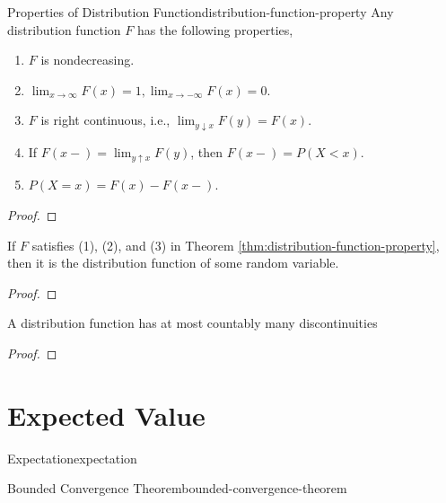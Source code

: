 \begin{theorem}{Properties of Distribution Function}{distribution-function-property}
    Any distribution function $F$ has the following properties,
    \begin{enumerate}
        \item $F$ is nondecreasing.
        \item $\lim_{x\rightarrow\infty}F(x)=1,\lim_{x \rightarrow-\infty}F(x)=0$.
        \item $F$ is right continuous, i.e., $\lim_{y \downarrow x} F(y)=F(x)$.
        \item If $F(x-)=\lim_{y\uparrow x}F(y)$, then $F(x-)=P(X<x)$.
        \item $P(X=x)=F(x)-F(x-)$.
    \end{enumerate}
\end{theorem}

\begin{proof}
    
\end{proof}

\begin{theorem}{}{}
    If $F$ satisfies (1), (2), and (3) in Theorem \ref{thm:distribution-function-property}, then it is the distribution function of some random variable.
\end{theorem}

\begin{proof}
    
\end{proof}

\begin{theorem}{}{}
    A distribution function has at most countably many discontinuities
\end{theorem}

\begin{proof}
    
\end{proof}

\section{Expected Value}

\begin{definition}{Expectation}{expectation}
    
\end{definition}

\begin{theorem}{Bounded Convergence Theorem}{bounded-convergence-theorem}
    
\end{theorem}

